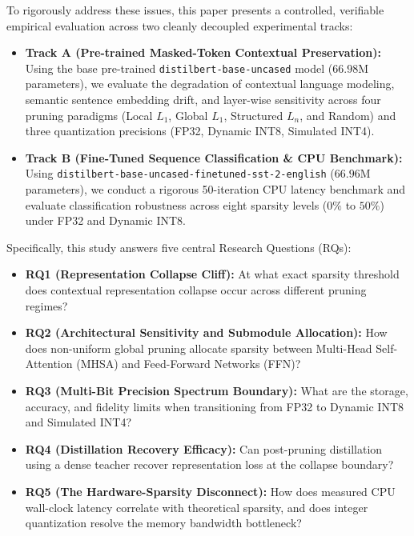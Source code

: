 \documentclass[conference]{IEEEtran}
\begin{document}
To rigorously address these issues, this paper presents a controlled, verifiable empirical evaluation across two cleanly decoupled experimental tracks:
\begin{itemize}
    \item \textbf{Track A (Pre-trained Masked-Token Contextual Preservation):} Using the base pre-trained \texttt{distilbert-}\allowbreak\texttt{base-}\allowbreak\texttt{uncased} model ($66.98\text{M}$ parameters), we evaluate the degradation of contextual language modeling, semantic sentence embedding drift, and layer-wise sensitivity across four pruning paradigms (Local $L_1$, Global $L_1$, Structured $L_n$, and Random) and three quantization precisions (FP32, Dynamic INT8, Simulated INT4).
    \item \textbf{Track B (Fine-Tuned Sequence Classification \& CPU Benchmark):} Using \texttt{distilbert-}\allowbreak\texttt{base-}\allowbreak\texttt{uncased-}\allowbreak\texttt{finetuned-}\allowbreak\texttt{sst-2-}\allowbreak\texttt{english} ($66.96\text{M}$ parameters), we conduct a rigorous 50-iteration CPU latency benchmark and evaluate classification robustness across eight sparsity levels ($0\%$ to $50\%$) under FP32 and Dynamic INT8.
\end{itemize}

Specifically, this study answers five central Research Questions (RQs):
\begin{itemize}
    \item \textbf{RQ1 (Representation Collapse Cliff):} At what exact sparsity threshold does contextual representation collapse occur across different pruning regimes?
    \item \textbf{RQ2 (Architectural Sensitivity and Submodule Allocation):} How does non-uniform global pruning allocate sparsity between Multi-Head Self-Attention (MHSA) and Feed-Forward Networks (FFN)?
    \item \textbf{RQ3 (Multi-Bit Precision Spectrum Boundary):} What are the storage, accuracy, and fidelity limits when transitioning from FP32 to Dynamic INT8 and Simulated INT4?
    \item \textbf{RQ4 (Distillation Recovery Efficacy):} Can post-pruning distillation using a dense teacher recover representation loss at the collapse boundary?
    \item \textbf{RQ5 (The Hardware-Sparsity Disconnect):} How does measured CPU wall-clock latency correlate with theoretical sparsity, and does integer quantization resolve the memory bandwidth bottleneck?
\end{itemize}
\end{document}
